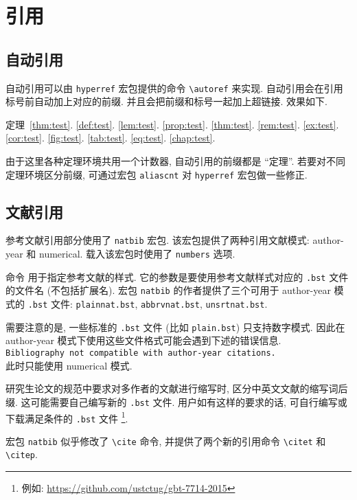 \chapter{引用}

\section{自动引用}

自动引用可以由 \verb|hyperref| 宏包提供的命令 \verb|\autoref| 来实现. 自动引用会在引用标号前自动加上对应的前缀. 并且会把前缀和标号一起加上超链接. 效果如下.

定理~\ref{thm:test}. \autoref{def:test}. \autoref{lem:test}. \autoref{prop:test}. \autoref{thm:test}. \autoref{rem:test}. \autoref{ex:test}. \autoref{cor:test}. \autoref{fig:test}. \autoref{tab:test}. \autoref{eq:test}. \autoref{chap:test}.

由于这里各种定理环境共用一个计数器, 自动引用的前缀都是 ``定理''. 若要对不同定理环境区分前缀, 可通过宏包 \verb|aliascnt| 对 \verb|hyperref| 宏包做一些修正.

\section{文献引用}

参考文献引用部分使用了 \verb|natbib| 宏包. 该宏包提供了两种引用文献模式: author-year 和 numerical. 载入该宏包时使用了 \verb|numbers| 选项.

命令 \verb|| 用于指定参考文献的样式. 它的参数是要使用参考文献样式对应的 \verb|.bst| 文件的文件名 (不包括扩展名). 宏包 \verb|natbib| 的作者提供了三个可用于 author-year 模式的 \verb|.bst| 文件: \verb|plainnat.bst|, \verb|abbrvnat.bst|, \verb|unsrtnat.bst|.

需要注意的是, 一些标准的 \verb|.bst| 文件 (比如 \verb|plain.bst|) 只支持数字模式. 因此在 author-year 模式下使用这些文件格式可能会遇到下述的错误信息.\\
\verb|Bibliography not compatible with author-year citations.|\\
此时只能使用 numerical 模式.

研究生论文的规范中要求对多作者的文献进行缩写时, 区分中英文文献的缩写词后缀. 这可能需要自己编写新的 \verb|.bst| 文件. 用户如有这样的要求的话, 可自行编写或下载满足条件的 \verb|.bst| 文件
\footnote{例如: \url{https://github.com/ustctug/gbt-7714-2015}}.

宏包 \verb|natbib| 似乎修改了 \verb|\cite| 命令, 并提供了两个新的引用命令 \verb|\citet| 和 \verb|\citep|.

